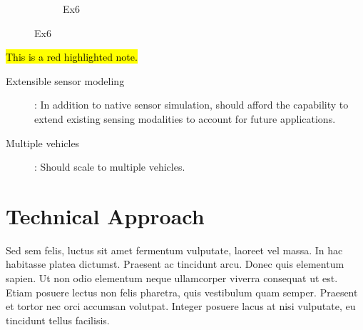 \documentclass[11pt]{article}
\DeclareRobustCommand{\hlr}[1]{{\sethlcolor{red}\hl{#1}}}
\begin{document}
\begin{figure}[h]
\begin{subfigure}[t]{0.3\textwidth}
    \caption{Ex6}
  \label{f:e1}
  \end{subfigure}
\end{figure}

\hlr{This is a red highlighted note.}

\begin{description}
\item[Extensible sensor modeling]: In addition to native sensor simulation, should afford the capability to extend existing sensing modalities to account for future applications.
\item[Multiple vehicles]: Should scale to multiple vehicles.
\end{description}

\section{Technical Approach}
Sed sem felis, luctus sit amet fermentum vulputate, laoreet vel massa. In hac habitasse platea dictumst. Praesent ac tincidunt arcu. Donec quis elementum sapien. Ut non odio elementum neque ullamcorper viverra consequat ut est. Etiam posuere lectus non felis pharetra, quis vestibulum quam semper. Praesent et tortor nec orci accumsan volutpat. Integer posuere lacus at nisi vulputate, eu tincidunt tellus facilisis.
\end{document}
